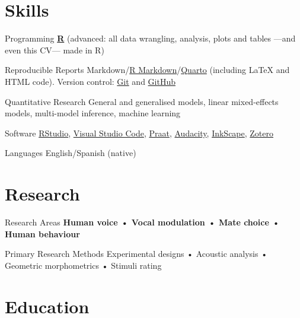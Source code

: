\documentclass[11pt,a4paper,]{awesome-cv}
\begin{document}
\section{Skills}\label{skills}

\begin{cvskills}
  \cvskill
    {Programming}
    {\href{https://www.r-project.org/}{\textbf{R}} (advanced: all data wrangling, analysis, plots and tables —and even this CV— made in R)}

  \cvskill
    {Reproducible Reports}
    {Markdown/\href{https://rmarkdown.rstudio.com/}{R Markdown}/\href{https://quarto.org/}{Quarto} (including {\selectfont\LaTeX} and HTML code). Version control: \href{https://git-scm.com/}{Git} \faGit* and \href{https://github.com/JDLeongomez}{GitHub} \faGithub}

  \cvskill
    {Quantitative Research}
    {General and generalised models, linear mixed-effects models, multi-model inference, machine learning}

  \cvskill
    {Software}
    {\href{https://posit.co/products/open-source/rstudio/}{RStudio}, \href{https://code.visualstudio.com/}{Visual Studio Code}, \href{https://www.fon.hum.uva.nl/praat/}{Praat}, \href{https://www.audacityteam.org/}{Audacity}, \href{https://inkscape.org/}{InkScape}, \href{https://www.zotero.org/}{Zotero}}

  \cvskill
    {Languages}
    {English/Spanish (native)}
\end{cvskills}

\section{Research}\label{research}

\begin{cvskills}
  \cvskill
    {Research Areas}
    {\textbf{Human voice • Vocal modulation • Mate choice • Human behaviour}}

  \cvskill
    {Primary Research Methods}
    {Experimental designs • Acoustic analysis • Geometric morphometrics • Stimuli rating}
\end{cvskills}

\section{Education}\label{education}
\end{document}
